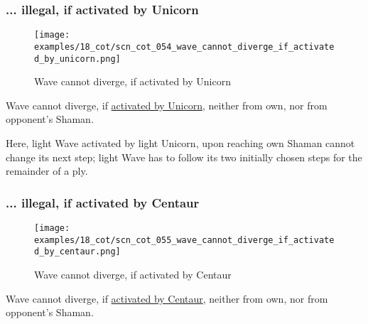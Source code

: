 \subsubsection*{... illegal, if activated by Unicorn}
\label{sec:Conquest of Tlalocan/Divergence/... illegal, if activated by Unicorn}

\vspace*{-1.4\baselineskip}
\noindent
\begin{figure}[!h]
\texttt{[image: examples/18\_cot/scn\_cot\_054\_wave\_cannot\_diverge\_if\_activated\_by\_unicorn.png]}
\vspace*{-1.3\baselineskip}
\caption{Wave cannot diverge, if activated by Unicorn}
\label{fig:scn_cot_054_wave_cannot_diverge_if_activated_by_unicorn}
\end{figure}

\vspace*{-0.5\baselineskip}
Wave cannot diverge, if
\hyperref[fig:scn_mv_27_wave_activation_by_unicorn_first_step]{activated by Unicorn},
neither from own, nor from opponent's Shaman.

Here, light Wave activated by light Unicorn, upon reaching own Shaman cannot change
its next step; light Wave has to follow its two initially chosen steps for the
remainder of a ply.

\clearpage %

\subsubsection*{... illegal, if activated by Centaur}
\label{sec:Conquest of Tlalocan/Divergence/... illegal, if activated by Centaur}

\vspace*{-1.4\baselineskip}
\noindent
\begin{figure}[!h]
\texttt{[image: examples/18\_cot/scn\_cot\_055\_wave\_cannot\_diverge\_if\_activated\_by\_centaur.png]}
\vspace*{-1.3\baselineskip}
\caption{Wave cannot diverge, if activated by Centaur}
\label{fig:scn_cot_055_wave_cannot_diverge_if_activated_by_centaur}
\end{figure}

\vspace*{-0.5\baselineskip}
Wave cannot diverge, if
\hyperref[fig:scn_hd_07_wave_activation_by_centaur_first_step]{activated by Centaur},
neither from own, nor from opponent's Shaman.

